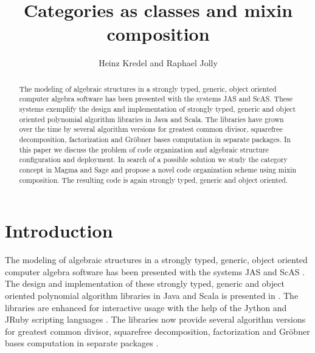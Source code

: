 \documentclass{llncs}
\begin{document}
\title{Categories as classes and mixin composition}

\author{Heinz Kredel and Raphael Jolly} 

\maketitle

\begin{abstract} 
  The modeling of algebraic structures in a strongly typed, generic,
  object oriented computer algebra software has been presented with
  the systems JAS and ScAS. These systems exemplify the design and
  implementation of strongly typed, generic and object oriented
  polynomial algorithm libraries in Java and Scala. The libraries have
  grown over the time by several algorithm versions for greatest
  common divisor, squarefree decomposition, factorization and
  Gr\"obner bases computation in separate packages. In this paper we
  discuss the problem of code organization and algebraic structure
  configuration and deployment.  In search of a possible solution we
  study the category concept in Magma and Sage and propose a novel
  code organization scheme using mixin composition. The resulting code
  is again strongly typed, generic and object oriented.
\end{abstract}



\section{Introduction} %

The modeling of algebraic structures in a strongly typed, generic,
object oriented computer algebra software has been presented with the
systems JAS \cite{Kredel:2008} and ScAS \cite{Jolly:2010}. %
The design and implementation of these strongly typed, generic and
object oriented polynomial algorithm libraries in Java and Scala is
presented in \cite{JollyKredel:2010,JollyKredel:2011}.  The libraries
are enhanced for interactive usage with the help of the Jython and
JRuby scripting languages \cite{JollyKredel:2009}.  The libraries now
provide several algorithm versions for greatest common divisor,
squarefree decomposition, factorization and Gr\"obner bases
computation in separate packages \cite{Kredel:2011}.
\end{document}
